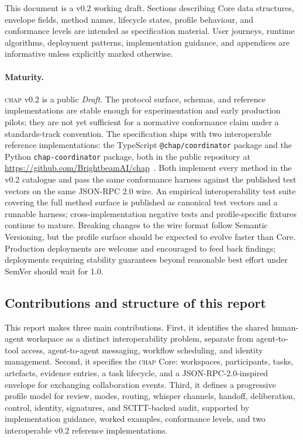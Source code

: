 \documentclass[11pt]{article}
\newcommand{\chap}{\textsc{chap}}
\begin{document}
This document is a v0.2 working draft. Sections describing Core data structures, envelope fields, method names, lifecycle states, profile behaviour, and conformance levels are intended as specification material. User journeys, runtime algorithms, deployment patterns, implementation guidance, and appendices are informative unless explicitly marked otherwise.

\paragraph{Maturity.} \chap{} v0.2 is a public \emph{Draft}. The protocol surface, schemas, and reference implementations are stable enough for experimentation and early production pilots; they are not yet sufficient for a normative conformance claim under a standards-track convention. The specification ships with two interoperable reference implementations: the TypeScript \texttt{@chap/coordinator} package and the Python \texttt{chap-coordinator} package, both in the public repository at \url{https://github.com/BrightbeamAI/chap}~\cite{chap-repo}. Both implement every method in the v0.2 catalogue and pass the same conformance harness against the published test vectors on the same JSON-RPC 2.0 wire. An empirical interoperability test suite covering the full method surface is published as canonical test vectors and a runnable harness; cross-implementation negative tests and profile-specific fixtures continue to mature. Breaking changes to the wire format follow Semantic Versioning, but the profile surface should be expected to evolve faster than Core. Production deployments are welcome and encouraged to feed back findings; deployments requiring stability guarantees beyond reasonable best effort under SemVer should wait for 1.0.

\subsection{Contributions and structure of this report}

This report makes three main contributions. First, it identifies the shared human-agent workspace as a distinct interoperability problem, separate from agent-to-tool access, agent-to-agent messaging, workflow scheduling, and identity management. Second, it specifies the \chap{} Core: workspaces, participants, tasks, artefacts, evidence entries, a task lifecycle, and a JSON-RPC-2.0-inspired envelope for exchanging collaboration events. Third, it defines a progressive profile model for review, modes, routing, whisper channels, handoff, deliberation, control, identity, signatures, and SCITT-backed audit, supported by implementation guidance, worked examples, conformance levels, and two interoperable v0.2 reference implementations.
\end{document}
